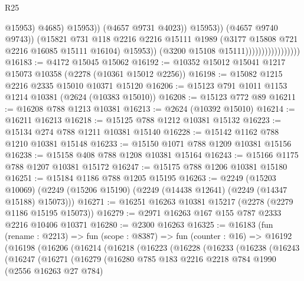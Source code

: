 \begin{lexlean}{R25}
\begin{coremodule}
                                                      @15953)
                                                    @4685)
                                                  @15953))
                                              (@4657 @9731 @4023))
                                            @15953))
                                        (@4657 @9740 @9743))
                                      (@15821
                                        @731
                                        @118
                                        @2216
                                        @2216
                                        @15111
                                        @1989
                                        (@3177 @15808 @721 @2216 @16085 @15111 @16104)
                                        @15953))
                                    (@3200 @15108 @15111)))))))))))))))))
@16183 := @4172 @15045 @15062
@16192 := @10352 @15012 @15041 @1217 @15073 @10358 (@2278 (@10361 @15012 @2256))
@16198 := @15082 @1215 @2216 @2335 @15010 @10371 @15120
@16206 := @15123 @791 @1011 @1153 @1214 @10381 (@2624 (@10383 @15010))
@16208 := @15123 @772 @89
@16211 := @16208 @788 @1213 @10381
@16213 := @2624 (@10392 @15010)
@16214 := @16211 @16213
@16218 := @15125 @788 @1212 @10381 @15132
@16223 := @15134 @274 @788 @1211 @10381 @15140
@16228 := @15142 @1162 @788 @1210 @10381 @15148
@16233 := @15150 @1071 @788 @1209 @10381 @15156
@16238 := @15158 @408 @788 @1208 @10381 @15164
@16243 := @15166 @1175 @788 @1207 @10381 @15172
@16247 := @15175 @788 @1206 @10381 @15180
@16251 := @15184 @1186 @788 @1205 @15195
@16263 := @2249
    (@15203 @10069)
    (@2249 (@15206 @15190) (@2249 (@14438 @12641) (@2249 (@14347 @15188) @15073)))
@16271 := @16251 @16263 @10381 @15217 (@2278 (@2279 @1186 @15195 @15073))
@16279 := @2971 @16263 @167 @155 @787 @2333 @2216 @10406 @10371
@16280 := @2300 @16263
@16325 := @16183
    (fun (rename : @2213) =>
    fun (scope : @8387) =>
    fun (counter : @16) =>
    @16192
      (@16198
        (@16206
          (@16214
            (@16218
              (@16223
                (@16228
                  (@16233
                    (@16238
                      (@16243
                        (@16247
                          (@16271
                            (@16279
                              (@16280
                                @785
                                @183
                                @2216
                                @2218
                                @784
                                @1990
                                (@2556 @16263 @27 @784)

\end{coremodule}
\end{lexlean}
